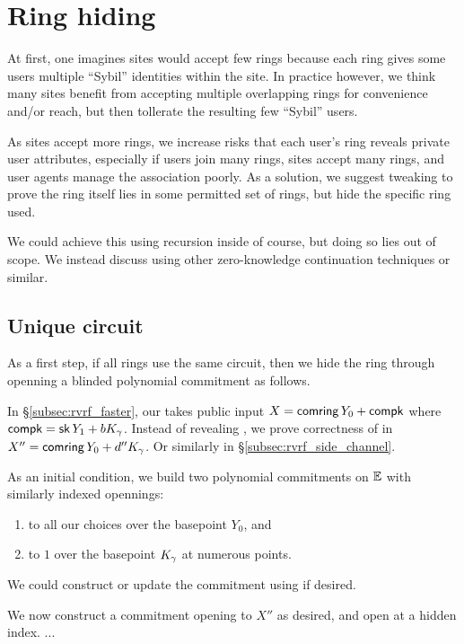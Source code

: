\section{Ring hiding}%
\label{sec:ring_hiding}

At first, one imagines sites would accept few rings because each ring
gives some users multiple ``Sybil'' identities within the site.
In practice however, we think many sites benefit from accepting
multiple overlapping rings for convenience and/or reach, but then
tollerate the resulting few ``Sybil'' users.

As sites accept more rings, we increase risks that each user's ring
\ctx reveals private user attributes, especially if
 users join many rings, sites accept many rings, and
 user agents manage the association poorly.
As a solution, we suggest tweaking \pifast to prove the ring itself
lies in some permitted set of rings, but hide the specific ring used.

We could achieve this using recursion inside \pifast of course,
but doing so lies out of scope.  We instead discuss using other
zero-knowledge continuation techniques or similar.


\subsection{Unique circuit}

As a first step, if all rings use the same circuit, then we hide the
ring through openning a blinded polynomial commitment \cite{KZG} as follows. 

In \S\ref{subsec:rvrf_faster}, our \pifast takes public input
$X = \mathsf{comring}\, Y_0 + \mathsf{compk}$ where $\mathsf{compk} = \mathsf{sk}\, Y_1 + b K_\gamma$.
Instead of revealing \comring, we prove correctness of \comring in
 $X'' = \mathsf{comring}\, Y_0 + d'' K_\gamma$.
Or similarly \pipk in \S\ref{subsec:rvrf_side_channel}.

As an initial condition, we build two polynomial commitments \cite{KZG}
on ${\mathbb{E}}$ with similarly indexed opennings:
\begin{enumerate}
\item to all our \comring choices over the basepoint $Y_0$, and
\item to $1$ over the basepoint $K_\gamma$ at numerous points.
\end{enumerate}
We could construct or update the \comring commitment using \cite{aSVC} if desired.

We now construct a commitment opening to $X''$ as desired, and
open at a hidden index. ...

